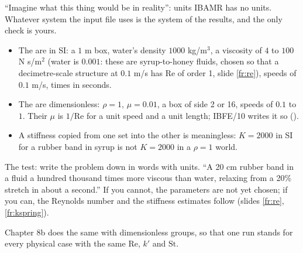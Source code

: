 \documentclass[aspectratio=169,11pt]{beamer}
\begin{document}
\begin{frame}{``Imagine what this thing would be in reality'': units}
\label{fr:units}
\small IBAMR has no units. Whatever system the input file uses is the system of the results, and the only check is yours.
\begin{itemize}
  \item The  are in SI: a $1$ m box, water's density $1000$ kg/m$^3$, a viscosity of $4$ to $100$ N s/m$^2$ (water is $0.001$: these are syrup-to-honey fluids, chosen so that a decimetre-scale structure at $0.1$ m/s has $\mathrm{Re}$ of order 1, slide \ref{fr:re}), speeds of $0.1$ m/s, times in seconds.
  \item The  are dimensionless: $\rho = 1$, $\mu = 0.01$, a box of side 2 or 16, speeds of $0.1$ to $1$. Their $\mu$ is $1/\mathrm{Re}$ for a unit speed and a unit length; IBFE/10 writes it so ().
  \item A stiffness copied from one set into the other is meaningless: $K = 2000$ in SI for a rubber band in syrup is not $K = 2000$ in a $\rho = 1$ world.
\end{itemize}
\vspace{1mm}
\begin{punchbox}
\small The test: write the problem down in words with units. ``A 20 cm rubber band in a fluid a hundred thousand times more viscous than water, relaxing from a 20\% stretch in about a second.'' If you cannot, the parameters are not yet chosen; if you can, the Reynolds number and the stiffness estimates follow (slides \ref{fr:re}, \ref{fr:kspring}).
\end{punchbox}
\vspace{1mm}
\small Chapter 8b does the same with dimensionless groups, so that one run stands for every physical case with the same $\mathrm{Re}$, $k'$ and $\mathrm{St}$.
\end{frame}
\end{document}
